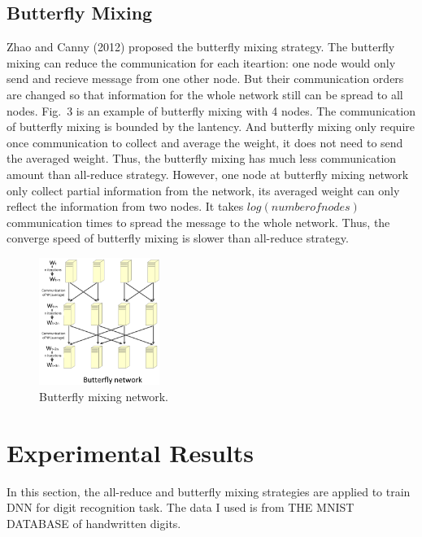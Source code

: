 \documentclass{article}
\begin{document}
\subsection{Butterfly Mixing}
 
Zhao and Canny (2012) proposed the butterfly mixing strategy. The butterfly mixing can reduce the communication for each iteartion: one node would only send and recieve message from one other node. But their communication orders are changed so that information for the whole network still can be spread to all nodes. Fig.~3 is an example of butterfly mixing with 4 nodes. The communication of butterfly mixing is bounded by the lantency. And butterfly mixing only require once communication to collect and average the weight, it does not need to send the averaged weight. Thus, the butterfly mixing has much less communication amount than all-reduce strategy. However, one node at butterfly mixing network only collect partial information from the network, its averaged weight can only reflect the information from two nodes. It takes $log(number of nodes)$ communication times to spread the message to the whole network. Thus, the converge speed of butterfly mixing is slower than all-reduce strategy. 
\begin{figure}[h!]
  
  \centering
    \includegraphics[width=0.35\textwidth]{butterfly.jpg}
    \caption{Butterfly mixing network.}
\end{figure}


\section{Experimental Results}
In this section, the all-reduce and butterfly mixing strategies are applied to train DNN for digit recognition task. The data I used is from THE MNIST DATABASE of handwritten digits. 
\end{document}
